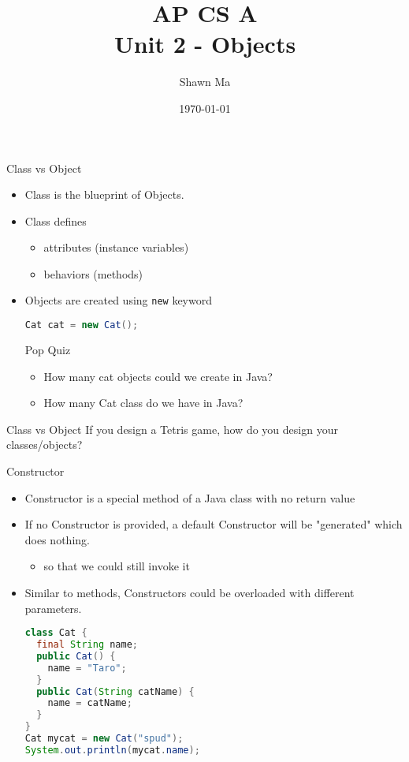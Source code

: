 \documentclass[aspectratio=169]{beamer}
\title{AP CS A\\Unit 2 - Objects}
\date{\today}
\author{Shawn Ma}
\begin{document}
\maketitle
\begin{frame}[fragile]{Class vs Object}
  \begin{itemize}
    \item Class is the \alert{blueprint} of Objects.
    \item Class defines
      \begin{itemize}
        \item attributes (instance variables)
        \item behaviors (methods)
      \end{itemize}
    \item Objects are created using \verb|new| keyword
    \begin{lstlisting}[language=Java]
    Cat cat = new Cat();
    \end{lstlisting}
      \begin{alertblock}{Pop Quiz}
        \begin{itemize}
          \item How many cat objects could we create in Java?
          \item How many Cat class do we have in Java?
        \end{itemize}
      \end{alertblock}
  \end{itemize}
\end{frame}

\begin{frame}[fragile]{Class vs Object}
  If you design a Tetris game, how do you design your classes/objects?
  \begin{center}
    
  \end{center}
\end{frame}

\begin{frame}[fragile]{Constructor}
  \begin{itemize}
    \item Constructor is a special method of a Java class with \alert{no return value}
    \item If no Constructor is provided, a default Constructor will be "generated" which does nothing.
      \begin{itemize}
        \item so that we could still invoke it
      \end{itemize}
    \item Similar to methods, Constructors could be overloaded with different parameters.
    \begin{lstlisting}[language=Java]
class Cat {
  final String name;
  public Cat() {
    name = "Taro";
  }
  public Cat(String catName) {
    name = catName;
  }
}
Cat mycat = new Cat("spud");
System.out.println(mycat.name);
    \end{lstlisting}
  \end{itemize}
\end{frame}
\end{document}
